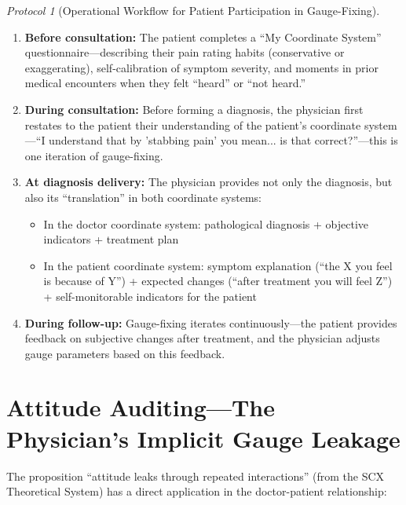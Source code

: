 \documentclass[12pt,a4paper]{article}
\theoremstyle{remark}
\newtheorem{protocol}[theorem]{Protocol}
\begin{document}
\begin{protocol}[Operational Workflow for Patient Participation in Gauge-Fixing]\label{prot:patient_gauge_fixing}
\begin{enumerate}[label=(\arabic*),itemsep=3pt]
    \item \textbf{Before consultation:} The patient completes a ``My Coordinate System'' questionnaire---describing their pain rating habits (conservative or exaggerating), self-calibration of symptom severity, and moments in prior medical encounters when they felt ``heard'' or ``not heard.''
    \item \textbf{During consultation:} Before forming a diagnosis, the physician first restates to the patient their understanding of the patient's coordinate system---``I understand that by 'stabbing pain' you mean... is that correct?''---this is one iteration of gauge-fixing.
    \item \textbf{At diagnosis delivery:} The physician provides not only the diagnosis, but also its ``translation'' in both coordinate systems:
    \begin{itemize}
        \item In the doctor coordinate system: pathological diagnosis + objective indicators + treatment plan
        \item In the patient coordinate system: symptom explanation (``the X you feel is because of Y'') + expected changes (``after treatment you will feel Z'') + self-monitorable indicators for the patient
    \end{itemize}
    \item \textbf{During follow-up:} Gauge-fixing iterates continuously---the patient provides feedback on subjective changes after treatment, and the physician adjusts gauge parameters based on this feedback.
\end{enumerate}
\end{protocol}

\section{Attitude Auditing---The Physician's Implicit Gauge Leakage}
\label{sec:attitude_audit}

The proposition ``attitude leaks through repeated interactions'' (from the SCX Theoretical System) has a direct application in the doctor-patient relationship:
\end{document}
